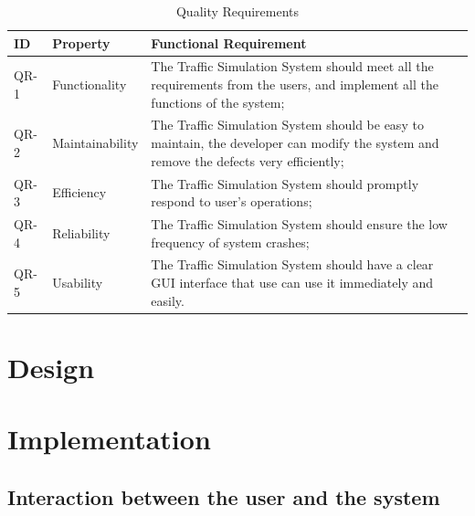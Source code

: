 \documentclass[a4paper,12pt]{article}
\begin{document}
\begin{table}[!htbp]
\centering
\label{versiontable}
\caption{Quality Requirements}
\begin{tabular}{|p{1.5cm}|p{3cm}|p{8cm}|}
\hline
ID & Property & Functional Requirement\\
\hline
QR-1& Functionality&  The Traffic Simulation System should meet all the requirements from the users, and implement all the functions of the system;\\
\hline
QR-2& Maintainability& The Traffic Simulation System should be easy to maintain, the developer can modify the system and remove the defects very efficiently;\\
\hline
QR-3& Efficiency& The Traffic Simulation System should promptly respond to user's operations;\\
\hline
QR-4& Reliability& The Traffic Simulation System should ensure the low frequency of system crashes;\\
\hline
QR-5& Usability& The Traffic Simulation System should have a clear GUI interface that use can use it immediately and easily.\\
\hline
\end{tabular}
\end{table}

\section{Design}

\section{Implementation}
\subsection{Interaction between the user and the system}
\end{document}
